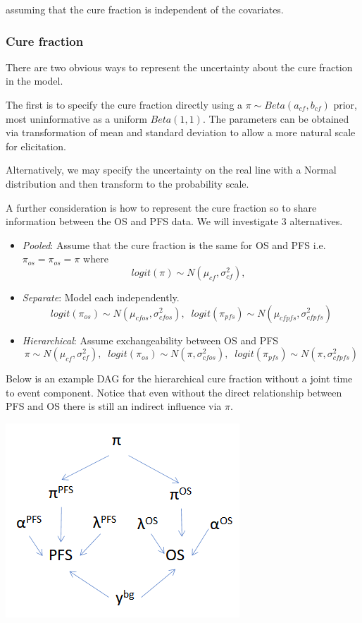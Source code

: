 \documentclass[
]{article}
\providecommand{\tightlist}{%
  \setlength{\itemsep}{0pt}\setlength{\parskip}{0pt}}
\begin{document}
assuming that the cure fraction is independent of the covariates.

\hypertarget{cure-fraction}{%
\subsubsection{Cure fraction}\label{cure-fraction}}

There are two obvious ways to represent the uncertainty about the cure
fraction in the model.

The first is to specify the cure fraction directly using a
\(\pi \sim Beta(a_{cf}, b_{cf})\) prior, most uninformative as a uniform
\(Beta(1,1)\). The parameters can be obtained via transformation of mean
and standard deviation to allow a more natural scale for elicitation.

Alternatively, we may specify the uncertainty on the real line with a
Normal distribution and then transform to the probability scale.

A further consideration is how to represent the cure fraction so to
share information between the OS and PFS data. We will investigate 3
alternatives.

\begin{itemize}
\tightlist
\item
  \emph{Pooled}: Assume that the cure fraction is the same for OS and
  PFS i.e.~\(\pi_{os} = \pi_{os} = \pi\) where \[
  logit(\pi) \sim N(\mu_{cf}, \sigma_{cf}^2), \;\;
  \]
\item
  \emph{Separate}: Model each independently. \[
  logit(\pi_{os}) \sim N(\mu_{cfos}, \sigma_{cfos}^2), \;\;  
  logit(\pi_{pfs}) \sim N(\mu_{cfpfs}, \sigma_{cfpfs}^2)  
  \]
\item
  \emph{Hierarchical}: Assume exchangeability between OS and PFS\[
  \pi \sim N(\mu_{cf}, \sigma_{cf}^2), \;\;  
  logit(\pi_{os}) \sim N(\pi, \sigma_{cfos}^2), \;\;  
  logit(\pi_{pfs}) \sim N(\pi, \sigma_{cfpfs}^2)  
  \]
\end{itemize}

Below is an example DAG for the hierarchical cure fraction without a
joint time to event component. Notice that even without the direct
relationship between PFS and OS there is still an indirect influence via
\(\pi\).

\begin{center}\includegraphics[width=0.4\linewidth]{hierarchical_DAG} \end{center}
\end{document}
